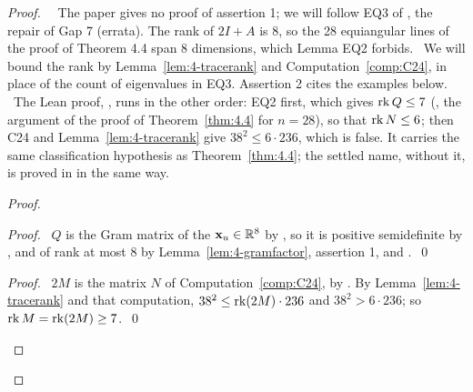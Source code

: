 \begin{proof}
 \pfsketch\ \repair\ The paper gives no proof of assertion 1; we will follow EQ3 of
 , the repair of Gap 7 (errata). The rank of $2I+A$ is 8, so the 28
 equiangular lines of the proof of Theorem 4.4 span 8 dimensions, which Lemma EQ2 forbids.
 \new\ We will bound the rank by Lemma~\ref{lem:4-tracerank} and Computation~\ref{comp:C24}, in
 place of the count of eigenvalues in EQ3. Assertion 2 cites the examples below.
 \new\ The Lean proof, ,
 runs in the other order: EQ2 first, which gives $\mathop{\mathrm{rk}}\nolimits Q\le7$
 (, the argument of
 the proof of Theorem~\ref{thm:4.4} for $n=28$), so that $\mathop{\mathrm{rk}}\nolimits N\le6$; then C24 and
 Lemma~\ref{lem:4-tracerank} give $38^2\le6\cdot236$, which is false. It carries the same
 classification hypothesis as Theorem~\ref{thm:4.4}; the settled name, without it, is
 proved in  in the same way.
 \begin{proof}
  \begin{proof}\pf\ $Q$ is the Gram matrix of the ${\mathbf x}_u\in{\mathbb R}^8$ by , so it is
   positive semidefinite by , and of rank at most 8 by
   Lemma~\ref{lem:4-gramfactor}, assertion 1, and .~\qed\end{proof}
  \begin{proof}\pf\ $2M$ is the matrix $N$ of Computation~\ref{comp:C24}, by . By
   Lemma~\ref{lem:4-tracerank} and that computation, $38^2\le\mathop{\mathrm{rk}}\nolimits(2M)\cdot236$ and
   $38^2>6\cdot236$; so $\mathop{\mathrm{rk}}\nolimits M=\mathop{\mathrm{rk}}\nolimits(2M)\ge7$.~\qed\end{proof}

\end{proof}
\end{proof}
